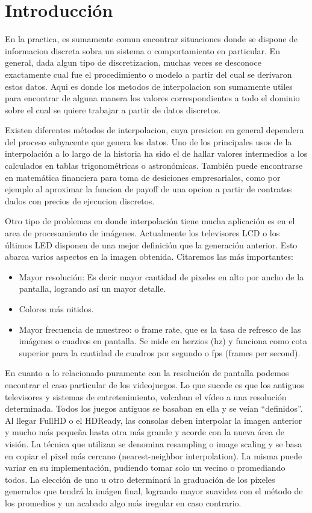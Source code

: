 \section{Introducción}

En la practica, es sumamente comun encontrar situaciones donde se dispone de informacion discreta sobra un sistema o comportamiento en particular. En general, dada algun tipo de discretizacion, muchas veces se desconoce exactamente cual fue el procedimiento o modelo a partir del cual se derivaron estos datos. Aqui es donde los metodos de interpolacion son sumamente utiles para encontrar de alguna manera los valores correspondientes a todo el dominio sobre el cual se quiere trabajar a partir de datos discretos.

Existen diferentes métodos de interpolacion, cuya presicion en general dependera del proceso subyacente que genera los datos. Uno de los principales usos de la interpolación a lo largo de la historia ha sido el de hallar valores intermedios a los calculados en tablas trigonométricas o astronómicas. También puede encontrarse en matemática financiera para toma de desiciones empresariales, como por ejemplo al aproximar la funcion de payoff de una opcion a  partir de contratos dados con precios de ejecucion discretos.

Otro tipo de problemas en donde interpolación tiene mucha aplicación es en el area de procesamiento de imágenes. 
Actualmente los televisores LCD o los últimos LED disponen de una mejor definición que la generación anterior. 
Esto abarca varios aspectos en la imagen obtenida. Citaremos las más importantes:
\begin{itemize}
	\item Mayor resolución: Es decir mayor cantidad de pixeles en alto por ancho de la pantalla, logrando así un mayor detalle.
	\item Colores más nitidos.
	\item Mayor frecuencia de muestreo: o frame rate, que es la tasa de refresco de las imágenes o cuadros en pantalla. Se mide en herzios (hz) y funciona como cota superior para la cantidad de cuadros por segundo o fps (frames per second).
\end{itemize}	

En cuanto a lo relacionado puramente con la resolución de pantalla podemos encontrar el caso particular de los videojuegos. 
Lo que sucede es que los antiguos televisores y sistemas de entretenimiento, volcaban el vídeo a una resolución determinada. Todos los juegos antiguos se basaban en ella y se veían “definidos”. Al llegar FullHD o el HDReady, las consolas deben interpolar la imagen anterior y mucho más pequeña hasta otra más grande y acorde con la nueva área de visión. La técnica que utilizan se denomina resampling o image scaling y se basa en copiar el pixel más cercano (nearest-neighbor interpolation). La misma puede variar en su implementación, pudiendo tomar solo un vecino o promediando todos. La elección de uno u otro determinará la graduación de los pixeles generados que tendrá la imágen final, logrando mayor suavidez con el método de los promedios y un acabado algo más iregular en caso contrario.

